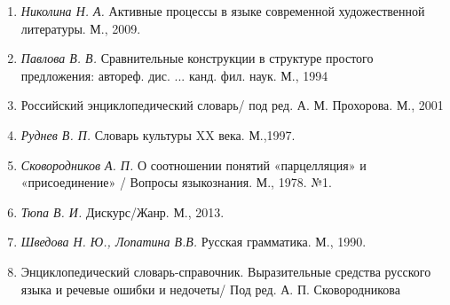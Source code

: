 \begin{enumerate}
        \item \textit{Николина Н. А.} Активные процессы в языке современной художественной литературы. М., 2009.
        \item \textit{Павлова В. В.} Сравнительные конструкции в структуре простого предложения: автореф. дис. ... канд. фил. наук. М., 1994
        \item Российский энциклопедический словарь/ под ред. А. М. Прохорова. М., 2001 
        \item \textit{Руднев В. П.} Словарь культуры XX века. М.,1997.
        \item \textit{Сковородников А. П.} О соотношении понятий «парцелляция» и «присоединение» / Вопросы языкознания. М., 1978. №1.
        \item \textit{Тюпа В. И.} Дискурс/Жанр. М., 2013.
        \item \textit{Шведова Н. Ю., Лопатина В.В.} Русская грамматика. М., 1990. 
        \item Энциклопедический словарь-справочник. Выразительные средства русского языка и речевые ошибки и недочеты/ Под ред. А. П. Сковородникова
      \end{enumerate}